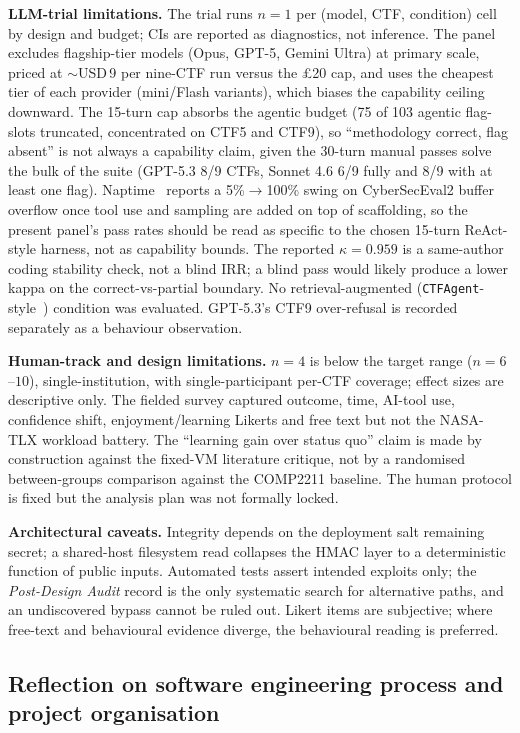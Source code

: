 \textbf{LLM-trial limitations.} The trial runs $n=1$ per
(model, CTF, condition) cell by design and budget; CIs are
reported as diagnostics, not inference. The panel excludes
flagship-tier models (Opus, GPT-5, Gemini Ultra) at primary
scale, priced at $\sim$USD\,9 per nine-CTF run versus the
\pounds20 cap, and uses the cheapest tier of each provider
(mini/Flash variants), which biases the capability ceiling
downward. The 15-turn cap absorbs the agentic budget (75 of
103 agentic flag-slots truncated, concentrated on CTF5 and
CTF9), so ``methodology correct, flag absent'' is not always
a capability claim, given the 30-turn manual passes solve
the bulk of the suite (GPT-5.3 8/9 CTFs, Sonnet 4.6 6/9
fully and 8/9 with at least one flag).
Naptime~\cite{Naptime2024} reports a 5\%$\rightarrow$100\%
swing on CyberSecEval2 buffer overflow once tool use and
sampling are added on top of scaffolding, so the present
panel's pass rates should be read as
specific to the chosen 15-turn ReAct-style harness, not as
capability bounds. The reported $\kappa = 0.959$ is a
same-author coding stability check, not a blind IRR; a blind
pass would likely produce a lower kappa on the
correct-vs-partial boundary. No retrieval-augmented
(\texttt{CTFAgent}-style~\cite{ji2025}) condition was
evaluated. GPT-5.3's CTF9 over-refusal is recorded separately as a
behaviour observation.

\textbf{Human-track and design limitations.} $n=4$ is below
the target range ($n=6$--$10$), single-institution, with
single-participant per-CTF coverage; effect sizes are
descriptive only. The fielded survey captured outcome, time,
AI-tool use, confidence shift, enjoyment/learning Likerts and
free text but not the NASA-TLX workload battery. The
``learning gain over status quo'' claim is made by
construction against the fixed-VM literature critique, not by
a randomised between-groups comparison against the COMP2211
baseline. The human protocol is fixed but the analysis plan
was not formally locked.

\textbf{Architectural caveats.} Integrity depends on the
deployment salt remaining secret; a shared-host filesystem
read collapses the HMAC layer to a deterministic function of
public inputs. Automated tests assert intended exploits only;
the \textit{Post-Design Audit} record is the only systematic
search for alternative paths, and an undiscovered bypass
cannot be ruled out. Likert items are subjective; where
free-text and behavioural evidence diverge, the behavioural
reading is preferred.

\subsection{Reflection on software engineering process and project organisation}
\label{sec:eval-se}

